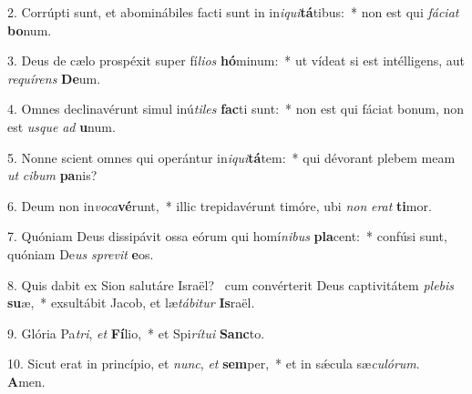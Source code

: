 2. Corrúpti sunt, et abominábiles facti sunt in in\textit{i}\textit{qui}\textbf{tá}tibus:~*  non est qui \textit{fá}\textit{ci}\textit{at} \textbf{bo}num.\

3. Deus de cælo prospéxit super fí\textit{li}\textit{os} \textbf{hó}minum:~*  ut vídeat si est intélligens, aut \textit{re}\textit{quí}\textit{rens} \textbf{De}um.\

4. Omnes declinavérunt simul inú\textit{ti}\textit{les} \textbf{fac}ti sunt:~*  non est qui fáciat bonum, non est \textit{us}\textit{que} \textit{ad} \textbf{u}num.\

5. Nonne scient omnes qui operántur in\textit{i}\textit{qui}\textbf{tá}tem:~*  qui dévorant plebem meam \textit{ut} \textit{ci}\textit{bum} \textbf{pa}nis?\

6. Deum non in\textit{vo}\textit{ca}\textbf{vé}runt,~*  illic trepidavérunt timóre, ubi \textit{non} \textit{e}\textit{rat} \textbf{ti}mor.\

7. Quóniam Deus dissipávit ossa eórum qui homí\textit{ni}\textit{bus} \textbf{pla}cent:~*  confúsi sunt, quóniam De\textit{us} \textit{spre}\textit{vit} \textbf{e}os.\

8. Quis dabit ex Sion salutáre Israël? \dag\  cum convérterit Deus captivitátem \textit{ple}\textit{bis} \textbf{su}æ,~*  exsultábit Jacob, et læ\textit{tá}\textit{bi}\textit{tur} \textbf{Is}raël.\

9. Glória Pa\textit{tri}, \textit{et} \textbf{Fí}lio,~*  et Spi\textit{rí}\textit{tu}\textit{i} \textbf{Sanc}to.\

10. Sicut erat in princípio, et \textit{nunc}, \textit{et} \textbf{sem}per,~*  et in sǽcula sæ\textit{cu}\textit{ló}\textit{rum}. \textbf{A}men.\

